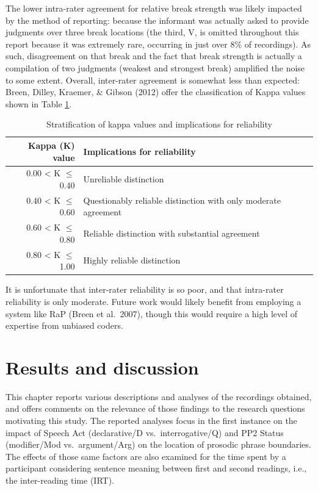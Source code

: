 \documentclass[11pt,oneside]{book}
\begin{document}
The lower intra-rater agreement for relative break strength was likely impacted by the method of reporting: because the informant was actually asked to provide judgments over three break locations (the third, V, is omitted throughout this report because it was extremely rare, occurring in just over 8\% of recordings). As such, disagreement on that break and the fact that break strength is actually a compilation of two judgments (weakest and strongest break) amplified the noise to some extent. Overall, inter-rater agreement is somewhat less than expected: Breen, Dilley, Kraemer, \& Gibson (2012) offer the classification of Kappa values shown in Table \ref{tab:agreements}.

\begin{table}[!h]

\caption{\label{tab:agreements}Stratification of kappa values and implications for reliability}
\centering
\begin{tabular}{rlrl}
\toprule
Kappa (K) value & Implications for reliability\\
\midrule
0.00 < K $\leq$ 0.40 & Unreliable distinction\\
0.40 < K $\leq$ 0.60 & Questionably reliable distinction with only moderate agreement\\
0.60 < K $\leq$ 0.80 & Reliable distinction with substantial agreement\\
0.80 < K $\leq$ 1.00 & Highly reliable distinction\\
\bottomrule
\end{tabular}
\end{table}

It is unfortunate that inter-rater reliability is so poor, and that intra-rater reliability is only moderate. Future work would likely benefit from employing a system like RaP (Breen et al.~2007), though this would require a high level of expertise from unbiased coders.

\hypertarget{res}{%
\chapter{Results and discussion}\label{res}}

\setlength\parindent{24pt}\setlength{\parskip}{0.0pt plus 1.0pt}

This chapter reports various descriptions and analyses of the recordings obtained, and offers comments on the relevance of those findings to the research questions motivating this study. The reported analyses focus in the first instance on the impact of Speech Act (declarative/D vs.~interrogative/Q) and PP2 Status (modifier/Mod vs.~argument/Arg) on the location of prosodic phrase boundaries. The effects of those same factors are also examined for the time spent by a participant considering sentence meaning between first and second readings, i.e., the inter-reading time (IRT).
\end{document}

